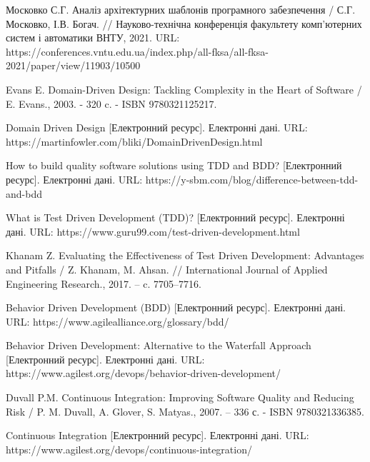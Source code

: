 \begingroup
\renewcommand{\section}[2]{\anonsection{Перелік джерел}}
\begin{thebibliography}{00}

      Московко С.Г.
      Аналіз архітектурних шаблонів програмного забезпечення /
      С.Г. Московко, І.В. Богач. //
      Науково-технічна конференція факультету комп'ютерних систем і автоматики
      ВНТУ, 2021.
      URL: https://conferences.vntu.edu.ua/index.php/all-fksa/all-fksa-2021/paper/view/11903/10500

      Evans E.
      Domain-Driven Design: Tackling Complexity in the Heart of Software /
      E. Evans., 2003. - 320 c. - ISBN 9780321125217.

      Domain Driven Design
      [Електронний ресурс]. Електронні дані.
      URL: https://martinfowler.com/bliki/DomainDrivenDesign.html
	
			How to build quality software solutions using TDD and BDD?
      [Електронний ресурс]. Електронні дані.
			URL: https://y-sbm.com/blog/difference-between-tdd-and-bdd

			What is Test Driven Development (TDD)?
      [Електронний ресурс]. Електронні дані.
      URL: https://www.guru99.com/test-driven-development.html
	
			Khanam Z.
			Evaluating the Effectiveness of Test Driven Development: Advantages and Pitfalls /
			Z. Khanam, M. Ahsan. //
			International Journal of Applied Engineering Research., 2017. – c. 7705–7716.
	
			Behavior Driven Development (BDD)
      [Електронний ресурс]. Електронні дані.
			URL: https://www.agilealliance.org/glossary/bdd/

			Behavior Driven Development: Alternative to the Waterfall Approach
      [Електронний ресурс]. Електронні дані.
			URL: https://www.agilest.org/devops/behavior-driven-development/
	
			Duvall P.M. 
			Continuous Integration: Improving Software Quality and Reducing Risk /
			P. M. Duvall, A. Glover, S. Matyas., 2007. – 336 с. - ISBN 9780321336385.
	
			Continuous Integration
      [Електронний ресурс]. Електронні дані.
			URL: https://www.agilest.org/devops/continuous-integration/
	

\end{thebibliography}
